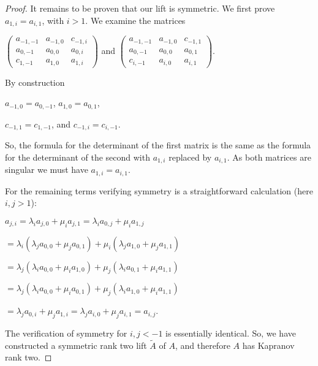 \documentclass{article}
\begin{document}
\begin{proof}
  It remains to be proven that our lift is symmetric. We first prove $a_{1,i} = a_{i,1}$, with $i > 1$. We examine the matrices
  
  \begin{center}
    $\left(\begin{array}{ccc} a_{-1,-1} & a_{-1,0} & c_{-1,i} \\ a_{0,-1} & a_{0,0} & a_{0,i} \\ c_{1,-1} & a_{1,0} & a_{1,i} \end{array}\right)$ \hspace{.1 in} and \hspace{.1 in} $\left(\begin{array}{ccc} a_{-1,-1} & a_{-1,0} & c_{-1,1} \\ a_{0,-1} & a_{0,0} & a_{0,1} \\ c_{i,-1} & a_{i,0} & a_{i,1} \end{array}\right)$.
  \end{center}
  
  By construction 
  \begin{center}
    $a_{-1,0} = a_{0,-1}$, \hspace{.1 in} $a_{1,0} = a_{0,1}$, 
    
    $c_{-1,1} = c_{1,-1}$, \hspace{.1 in} and \hspace{.1 in} $c_{-1,i} = c_{i,-1}$. 
  \end{center}
  So, the formula for the determinant of the first matrix is the same as the formula for the determinant of the second with $a_{1,i}$ replaced by $a_{i,1}$. As both matrices are singular we must have $a_{1,i} = a_{i,1}$.
  
  For the remaining terms verifying symmetry is a straightforward calculation (here $i,j > 1$):
  \begin{center}
    $a_{j,i} = \lambda_{i} a_{j,0} + \mu_{i} a_{j,1} = \lambda_{i} a_{0,j} + \mu_{i} a_{1,j}$

    $= \lambda_{i} (\lambda_{j} a_{0,0} + \mu_{j} a_{0,1}) + \mu_{i} (\lambda_{j} a_{1,0} + \mu_{j} a_{1,1})$

    $= \lambda_{j} (\lambda_{i} a_{0,0} + \mu_{i} a_{1,0}) + \mu_{j} (\lambda_{i} a_{0,1} + \mu_{i} a_{1,1})$

    $= \lambda_{j} (\lambda_{i} a_{0,0} + \mu_{i} a_{0,1}) + \mu_{j} (\lambda_{i} a_{1,0} + \mu_{i} a_{1,1})$

    $= \lambda_{j} a_{0,i} + \mu_{j} a_{1,i} = \lambda_{j} a_{i,0} + \mu_{j} a_{i,1} = a_{i,j}$.
    
  \end{center}
  The verification of symmetry for $i,j < -1$ is essentially identical. So, we have constructed a symmetric rank two lift $\tilde{A}$ of $A$, and therefore $A$ has Kapranov rank two.
\end{proof}
\end{document}
